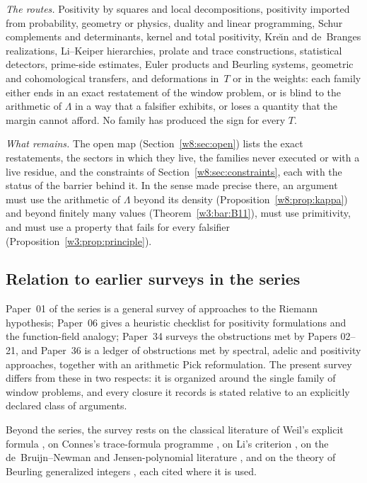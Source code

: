 \documentclass[11pt]{amsart}
\theoremstyle{definition}
\theoremstyle{remark}
\numberwithin{equation}{section}
\begin{document}
\emph{The routes.} Positivity by squares and local decompositions,
positivity imported from probability, geometry or physics, duality and linear
programming, Schur complements and determinants, kernel and total positivity,
Kre\u{\i}n and de~Branges realizations, Li--Keiper hierarchies, prolate and
trace constructions, statistical detectors, prime-side estimates, Euler
products and Beurling systems, geometric and cohomological transfers, and
deformations in~$T$ or in the weights: each family either ends in an exact
restatement of the window problem, or is blind to the arithmetic of
$\Lambda$ in a way that a falsifier exhibits, or loses a quantity that the
margin cannot afford. No family has produced the sign for every $T$.

\emph{What remains.} The open map (Section~\ref{w8:sec:open}) lists the exact
restatements, the sectors in which they live, the families never executed or
with a live residue, and the constraints of Section~\ref{w8:sec:constraints},
each with the status of the barrier behind it. In the sense made precise
there, an argument must use the arithmetic of $\Lambda$ beyond its density
(Proposition~\ref{w8:prop:kappa}) and beyond finitely many values
(Theorem~\ref{w3:bar:B11}), must use primitivity, and must use a property
that fails for every falsifier (Proposition~\ref{w3:prop:principle}).

\subsection{Relation to earlier surveys in the series}
Paper~01 of the series \cite{P01} is a general survey of approaches to the
Riemann hypothesis; Paper~06 \cite{P06} gives a heuristic checklist for
positivity formulations and the function-field analogy; Paper~34 \cite{P34}
surveys the obstructions met by Papers 02--21, and Paper~36 \cite{P36} is a
ledger of obstructions met by spectral, adelic and positivity approaches,
together with an arithmetic Pick reformulation. The present survey differs
from these in two respects: it is organized around the single family of
window problems, and every closure it records is stated relative to an
explicitly declared class of arguments.

Beyond the series, the survey rests on the classical literature of Weil's
explicit formula \cite{Weil52,Bombieri2000,Yoshida1992}, on Connes's
trace-formula programme \cite{Connes1999,ConnesConsani2021}, on Li's
criterion \cite{Li1997,BombieriLagarias1999}, on the de~Bruijn--Newman and
Jensen-polynomial literature \cite{deBruijn1950,Newman1976,RodgersTao2020,GORZ2019},
and on the theory of Beurling generalized integers
\cite{DiamondZhang2016,DMV2006,Zhang2007}, each cited where it is used.
\end{document}
